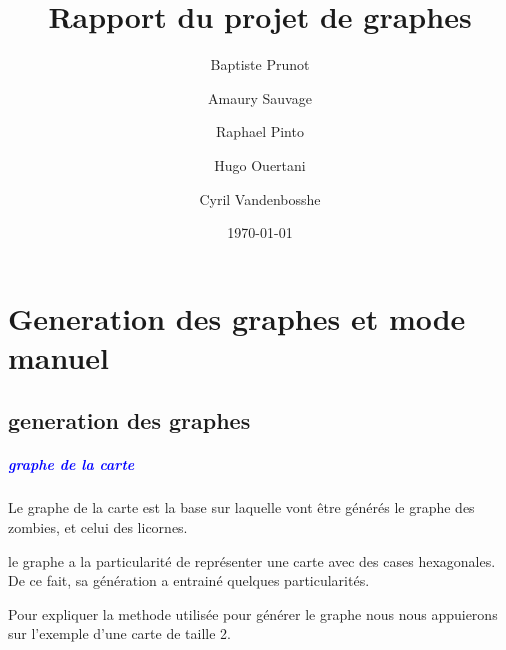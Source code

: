 \documentclass{report}
\title{Rapport du projet de graphes}
\author{Baptiste Prunot
\and Amaury Sauvage
\and Raphael Pinto
\and Hugo Ouertani
\and Cyril Vandenbosshe}
\date{\today}
\begin{document}
	\maketitle 
	
	\chapter{Generation des graphes et mode manuel}
		\section{generation des graphes}
			
			\paragraph{\textcolor{blue}{graphe de la carte}}
			Le graphe de la carte est la base sur laquelle vont \^etre g\'en\'er\'es le graphe des zombies, et celui des licornes.
			
			le graphe a la particularit\'e de repr\'esenter une carte avec des cases hexagonales. De ce fait, sa g\'en\'eration a entrain\'e quelques particularit\'es.
			
			Pour expliquer la methode utilis\'ee pour g\'en\'erer le graphe nous nous appuierons sur l'exemple d'une carte de taille 2.
			
\end{document}
